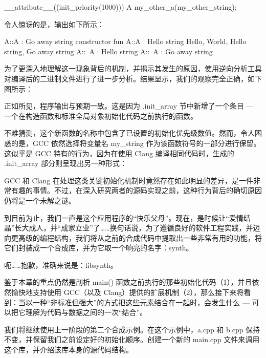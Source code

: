 \begin{cpp}
__attribute__((init_priority(1000)))
A my_other_a(my_other_string);
\end{cpp}

令人惊讶的是，输出如下所示：

\begin{shell}
A::A : Go away string
constructor fun
A::A : Hello string
Hello, World, Hello string, Go away string
A::~A : Hello string
A::~A : Go away string
\end{shell}

为了更深入地理解这一现象背后的机制，并揭示其发生的原因，使用逆向分析工具对编译后的二进制文件进行了进一步分析。结果显示，我们的观察完全正确，如下图所示：


正如所见，程序输出与预期一致。这是因为 .init\_array 节中新增了一个条目 --- 一个在构造函数和标准全局对象初始化代码之前执行的函数。

不难猜测，这个新函数的名称中包含了已设置的初始化优先级数值。然而，令人困惑的是，GCC 依然选择将变量名 my\_string 作为该函数符号的一部分进行保留。这似乎是 GCC 特有的行为，因为在使用 Clang 编译相同代码时，生成的 .init\_array 部分则呈现出另一种形式：


GCC 和 Clang 在处理这类关键初始化机制时竟然存在如此明显的差异，是一件非常有趣的事情。不过，在深入研究两者的源码实现之前，这种行为背后的确切原因仍将是一个未解之谜。


到目前为止，我们一直是这个应用程序的“快乐父母”。现在，是时候让“爱情结晶”长大成人，并“成家立业”了……换句话说，为了遵循良好的软件工程实践，并迈向更高级的编程结构，我们将从之前的合成代码中提取出一些非常有用的功能，将它们封装成一个合成库，并为它取一个响亮的名字：synth。

呃……抱歉，准确来说是：libsynth。

鉴于本章的重点仍然是剖析 main() 函数之前执行的那些初始化代码（1），并且依然愉快地支持使用 GCC（以及 Clang）提供的扩展机制（2），那么接下来将看到：当以一种“非标准但强大”的方式把这些元素结合在一起时，会发生什么 --- 可以把它理解为代码与数据之间的一次“结合”。

我们将继续使用上一阶段的第二个合成示例。在这个示例中，a.cpp 和 b.cpp 保持不变，并保留我们之前设定好的初始化顺序。创建一个新的 main.cpp 文件来调用这个库，并介绍该库本身的源代码结构。

